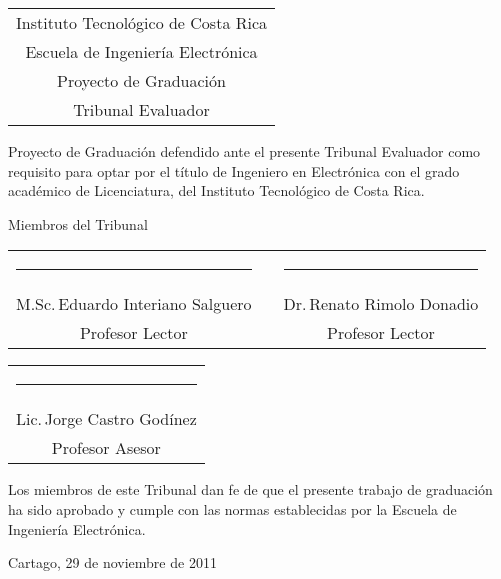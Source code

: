 \thispagestyle{empty}

\newcommand{\lectorI}{M.Sc.\,Eduardo Interiano Salguero}
\newcommand{\lectorII}{Dr.\,Renato Rimolo Donadio}
\newcommand{\director}{Lic.\,Jorge Castro Godínez}


\begin{center}
  \begin{tabular}{c}
    Instituto Tecnológico de Costa Rica \\
    Escuela de Ingeniería Electrónica \\
    Proyecto de Graduación \\
    Tribunal Evaluador
  \end{tabular}
\end{center}

\vfill

Proyecto de Graduación defendido ante el presente Tribunal Evaluador como 
requisito para optar por el título de Ingeniero en Electrónica con el grado 
académico de Licenciatura, del Instituto Tecnológico de Costa Rica.  

\vfill

\vspace*{20mm}
\begin{center}
 Miembros del Tribunal
\end{center}
\vspace*{8mm}

\vfill

\begin{center}
  \begin{tabular}{ccc}
    \rule{70mm}{0.5pt} & \rule{15mm}{0pt} & \rule{70mm}{0.5pt} \\
    \lectorI && \lectorII \\
    Profesor Lector && Profesor Lector
  \end{tabular}
  
  \vspace{10mm}

  \begin{tabular}{c}
    \rule{6cm}{0.5pt} \\
    \director \\
    Profesor Asesor
  \end{tabular}
\end{center}

\vfill


Los miembros de este Tribunal dan fe de que el presente trabajo de graduación
ha sido aprobado y cumple con las normas establecidas por la Escuela de
Ingeniería Electrónica.

\vfill

\begin{center}
  Cartago, 29 de noviembre de 2011\par
\end{center}

\cleardoublepage

